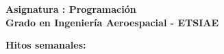 \documentclass[12pt,spanish]{article}
\begin{document}
\begin{center}
      	{\bf Asignatura : Programación}                                         
	\\
	{\bf Grado en Ingeniería Aeroespacial - ETSIAE}                                            \\

\end{center}

\vspace{0.5cm}

\noindent
{\bf \Large Hitos semanales: 
}                                                                               
     \\

\vspace{-1.cm}
\end{document}
